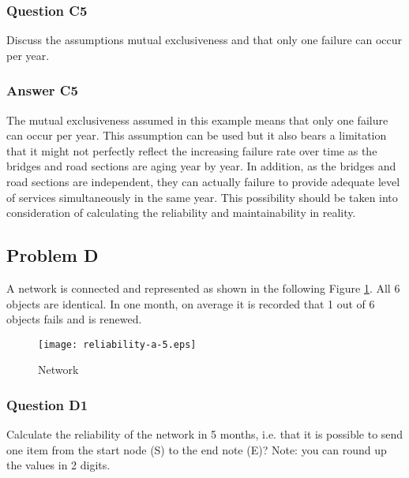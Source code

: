 \subsubsection{Question C5}
Discuss the assumptions mutual exclusiveness and that only one failure can occur
per year.
\subsubsection{Answer C5}
The mutual exclusiveness assumed in this example means that only one failure can
occur per year. This assumption can be used but it also bears a limitation that
it might not perfectly reflect the increasing failure rate over time as the
bridges and road sections are aging year by year. In addition, as the bridges and
road sections are independent, they can actually failure to provide adequate
level of services simultaneously in the same year. This possibility should be
taken into consideration of calculating the reliability and maintainability in
reality.
\subsection{Problem D}
A network is connected and represented as shown in the following Figure
\ref{reliability-a-5}. All 6 objects are identical. In one month, on average it is recorded
that 1 out of 6 objects fails and is renewed.

\begin{figure}[h]
\texttt{[image: reliability-a-5.eps]}
\caption{Network}\label{reliability-a-5}
\end{figure}
\subsubsection{Question D1}
Calculate the reliability of the network in 5 months, i.e. that it is possible
to send one item from the start node (S) to the end note (E)? Note: you can round
up the values in 2 digits.
